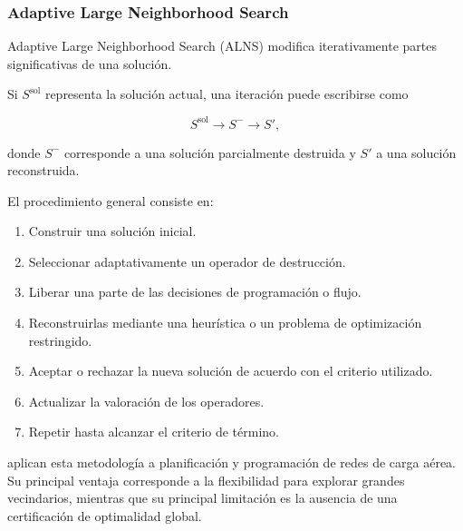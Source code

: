 \subsubsection{Adaptive Large Neighborhood Search}
\label{app:alns}

Adaptive Large Neighborhood Search (ALNS) modifica iterativamente partes significativas de
una solución.

Si $S^{\mathrm{sol}}$ representa la solución actual, una iteración puede escribirse como

\[
S^{\mathrm{sol}}
\longrightarrow
S^{-}
\longrightarrow
S',
\]

donde $S^{-}$ corresponde a una solución parcialmente destruida y $S'$ a una solución
reconstruida.

El procedimiento general consiste en:

\begin{enumerate}

    \item Construir una solución inicial.

    \item Seleccionar adaptativamente un operador de destrucción.

    \item Liberar una parte de las decisiones de programación o flujo.

    \item Reconstruirlas mediante una heurística o un problema de optimización restringido.

    \item Aceptar o rechazar la nueva solución de acuerdo con el criterio utilizado.

    \item Actualizar la valoración de los operadores.

    \item Repetir hasta alcanzar el criterio de término.

\end{enumerate}

 aplican esta metodología a planificación y programación de redes de
carga aérea. Su principal ventaja corresponde a la flexibilidad para explorar grandes
vecindarios, mientras que su principal limitación es la ausencia de una certificación de
optimalidad global.


